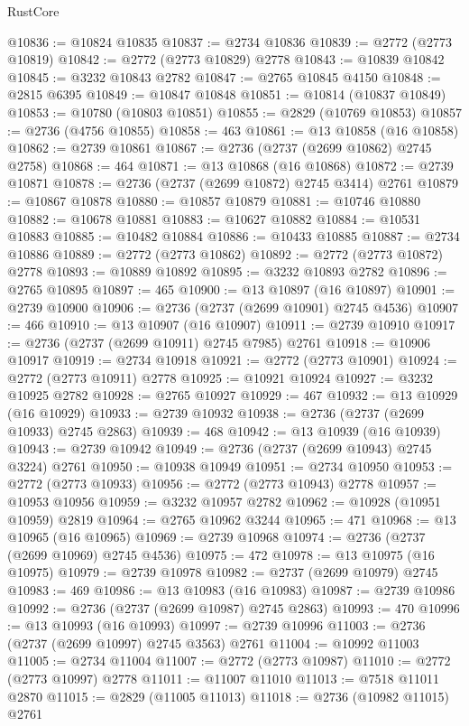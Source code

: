 \begin{lexlean}{RustCore}
\begin{coremodule}
@10836 := @10824 @10835
@10837 := @2734 @10836
@10839 := @2772 (@2773 @10819)
@10842 := @2772 (@2773 @10829) @2778
@10843 := @10839 @10842
@10845 := @3232 @10843 @2782
@10847 := @2765 @10845 @4150
@10848 := @2815 @6395
@10849 := @10847 @10848
@10851 := @10814 (@10837 @10849)
@10853 := @10780 (@10803 @10851)
@10855 := @2829 (@10769 @10853)
@10857 := @2736 (@4756 @10855)
@10858 := 463
@10861 := @13 @10858 (@16 @10858)
@10862 := @2739 @10861
@10867 := @2736 (@2737 (@2699 @10862) @2745 @2758)
@10868 := 464
@10871 := @13 @10868 (@16 @10868)
@10872 := @2739 @10871
@10878 := @2736 (@2737 (@2699 @10872) @2745 @3414) @2761
@10879 := @10867 @10878
@10880 := @10857 @10879
@10881 := @10746 @10880
@10882 := @10678 @10881
@10883 := @10627 @10882
@10884 := @10531 @10883
@10885 := @10482 @10884
@10886 := @10433 @10885
@10887 := @2734 @10886
@10889 := @2772 (@2773 @10862)
@10892 := @2772 (@2773 @10872) @2778
@10893 := @10889 @10892
@10895 := @3232 @10893 @2782
@10896 := @2765 @10895
@10897 := 465
@10900 := @13 @10897 (@16 @10897)
@10901 := @2739 @10900
@10906 := @2736 (@2737 (@2699 @10901) @2745 @4536)
@10907 := 466
@10910 := @13 @10907 (@16 @10907)
@10911 := @2739 @10910
@10917 := @2736 (@2737 (@2699 @10911) @2745 @7985) @2761
@10918 := @10906 @10917
@10919 := @2734 @10918
@10921 := @2772 (@2773 @10901)
@10924 := @2772 (@2773 @10911) @2778
@10925 := @10921 @10924
@10927 := @3232 @10925 @2782
@10928 := @2765 @10927
@10929 := 467
@10932 := @13 @10929 (@16 @10929)
@10933 := @2739 @10932
@10938 := @2736 (@2737 (@2699 @10933) @2745 @2863)
@10939 := 468
@10942 := @13 @10939 (@16 @10939)
@10943 := @2739 @10942
@10949 := @2736 (@2737 (@2699 @10943) @2745 @3224) @2761
@10950 := @10938 @10949
@10951 := @2734 @10950
@10953 := @2772 (@2773 @10933)
@10956 := @2772 (@2773 @10943) @2778
@10957 := @10953 @10956
@10959 := @3232 @10957 @2782
@10962 := @10928 (@10951 @10959) @2819
@10964 := @2765 @10962 @3244
@10965 := 471
@10968 := @13 @10965 (@16 @10965)
@10969 := @2739 @10968
@10974 := @2736 (@2737 (@2699 @10969) @2745 @4536)
@10975 := 472
@10978 := @13 @10975 (@16 @10975)
@10979 := @2739 @10978
@10982 := @2737 (@2699 @10979) @2745
@10983 := 469
@10986 := @13 @10983 (@16 @10983)
@10987 := @2739 @10986
@10992 := @2736 (@2737 (@2699 @10987) @2745 @2863)
@10993 := 470
@10996 := @13 @10993 (@16 @10993)
@10997 := @2739 @10996
@11003 := @2736 (@2737 (@2699 @10997) @2745 @3563) @2761
@11004 := @10992 @11003
@11005 := @2734 @11004
@11007 := @2772 (@2773 @10987)
@11010 := @2772 (@2773 @10997) @2778
@11011 := @11007 @11010
@11013 := @7518 @11011 @2870
@11015 := @2829 (@11005 @11013)
@11018 := @2736 (@10982 @11015) @2761

\end{coremodule}
\end{lexlean}
